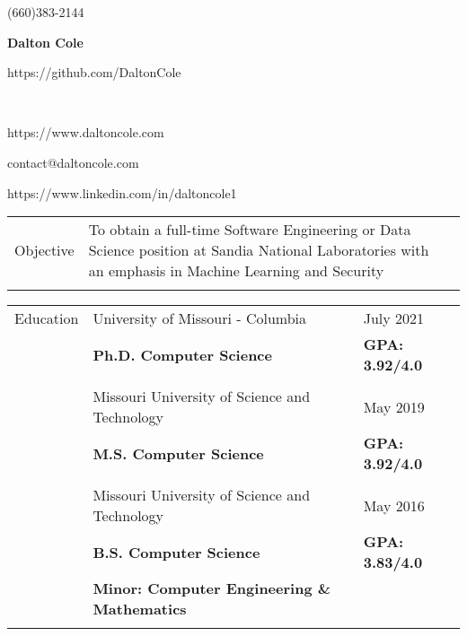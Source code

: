 \documentclass[10.5pt, arial]{article}
\newcommand\textbox[1]{%
  \parbox{.333\textwidth}{#1}%
}
\begin{document}
\noindent   \textbox{(660)383-2144 \hfill}                                \textbox{\hfil \textbf{Dalton Cole}    \hfil} \textbox{\hfill https://github.com/DaltonCole} \\
\noindent   \textbox{https://www.daltoncole.com \hfill}     \textbox{\hfil contact@daltoncole.com  \hfil}               \textbox{\hfill https://www.linkedin.com/in/daltoncole1}
\noindent\makebox[\linewidth]{\rule{\textwidth}{.4pt}} 

\begin{tabular}{p{1.5cm} p{13.2cm} l}
        Objective  	& To obtain a full-time Software Engineering or Data Science position at Sandia National Laboratories with an emphasis in Machine Learning and Security   & \\ \\
\end{tabular}

\begin{tabular}{p{1.5cm} p{13.2cm} l}
Education  	& University of Missouri - Columbia				 					& July 2021 				\\
			& \textbf{Ph.D. Computer Science} 									& \textbf{GPA: 3.92/4.0}	\\
            \\
			& Missouri University of Science and Technology 					& May 2019 				    \\
			& \textbf{M.S. Computer Science}									& \textbf{GPA: 3.92/4.0}	\\
            \\
		  	& Missouri University of Science and Technology 					& May 2016 				    \\
			& \textbf{B.S. Computer Science} 									& \textbf{GPA: 3.83/4.0}    \\
			& \textbf{Minor: Computer Engineering \& Mathematics} 										    \\ \\
\end{tabular}
\end{document}
